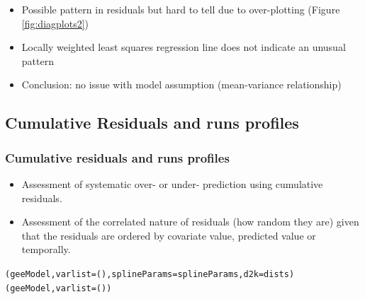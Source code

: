 \begin{frame}
\begin{itemize}
\item Possible pattern in residuals but hard to tell due to over-plotting  (Figure \ref{fig:diagplots2})
\item Locally weighted least squares regression line does not indicate an unusual pattern
\pause
\bigskip
\item Conclusion: no issue with model assumption (mean-variance relationship)
\end{itemize}
\end{frame}

\subsection{Cumulative Residuals and runs profiles}

\begin{frame}[fragile]
\frametitle{Cumulative residuals and runs profiles}
\begin{itemize}
\item Assessment of systematic over- or under- prediction using cumulative residuals.
\item Assessment of the correlated nature of residuals (how random they are) given that the residuals are ordered by covariate value, predicted value or temporally.
\end{itemize}

\begin{knitrout}\footnotesize
{}\color{fgcolor}\begin{kframe}
\begin{alltt}
(geeModel, varlist=(), splineParams=splineParams, d2k=dists)
(geeModel, varlist=())
\end{alltt}
\end{kframe}
\end{knitrout}

\end{frame}

